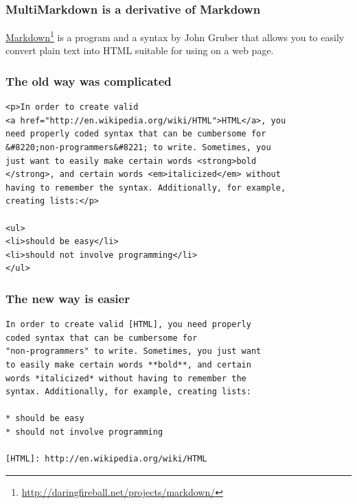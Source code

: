 
\def\mytitle{What is MultiMarkdown?}
\def\subtitle{And why should you care?}
\def\myauthor{Fletcher T. Penney}
\def\affiliation{http:\slash \slash fletcherpenney.net\slash multimarkdown\slash }
\def\mycopyright{2009-2011 Fletcher T. Penney. This work is licensed under a Creative Commons License. http:\slash \slash creativecommons.org\slash licenses\slash by-sa\slash 2.5\slash }

\def\theme{keynote-gradient}


\begin{frame}[fragile]
\frametitle{MultiMarkdown is a derivative of Markdown }
\label{multimarkdownisaderivativeofmarkdown}

\href{http://daringfireball.net/projects/markdown/}{Markdown}\footnote{\href{http://daringfireball.net/projects/markdown/}{http:\slash \slash daringfireball.net\slash projects\slash markdown\slash }} is a program and a
syntax by John Gruber that allows you to easily convert plain text into HTML
suitable for using on a web page.

\end{frame}

\begin{frame}[fragile]
\frametitle{The old way was complicated }
\label{theoldwaywascomplicated}

\begin{verbatim}
<p>In order to create valid 
<a href="http://en.wikipedia.org/wiki/HTML">HTML</a>, you 
need properly coded syntax that can be cumbersome for 
&#8220;non-programmers&#8221; to write. Sometimes, you
just want to easily make certain words <strong>bold
</strong>, and certain words <em>italicized</em> without
having to remember the syntax. Additionally, for example,
creating lists:</p>

<ul>
<li>should be easy</li>
<li>should not involve programming</li>
</ul>
\end{verbatim}

\end{frame}

\begin{frame}[fragile]
\frametitle{The new way is easier }
\label{thenewwayiseasier}

\begin{verbatim}
In order to create valid [HTML], you need properly
coded syntax that can be cumbersome for 
"non-programmers" to write. Sometimes, you just want
to easily make certain words **bold**, and certain 
words *italicized* without having to remember the 
syntax. Additionally, for example, creating lists:

* should be easy
* should not involve programming

[HTML]: http://en.wikipedia.org/wiki/HTML
\end{verbatim}

\end{frame}

